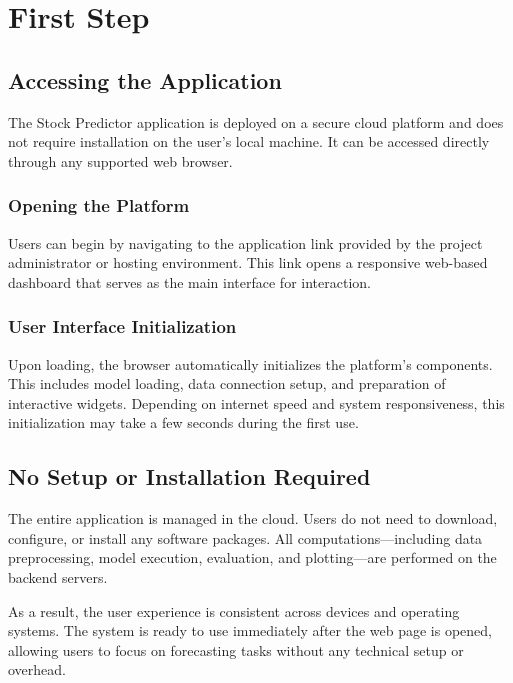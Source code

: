 %
%

\chapter{First Step}

\section{Accessing the Application}
The Stock Predictor application is deployed on a secure cloud platform and does not require installation on the user's local machine. It can be accessed directly through any supported web browser.

\subsection{Opening the Platform}
Users can begin by navigating to the application link provided by the project administrator or hosting environment. This link opens a responsive web-based dashboard that serves as the main interface for interaction.

\subsection{User Interface Initialization}
Upon loading, the browser automatically initializes the platform's components. This includes model loading, data connection setup, and preparation of interactive widgets. Depending on internet speed and system responsiveness, this initialization may take a few seconds during the first use.


\section{No Setup or Installation Required}
The entire application is managed in the cloud. Users do not need to download, configure, or install any software packages. All computations—including data preprocessing, model execution, evaluation, and plotting—are performed on the backend servers.

As a result, the user experience is consistent across devices and operating systems. The system is ready to use immediately after the web page is opened, allowing users to focus on forecasting tasks without any technical setup or overhead.


